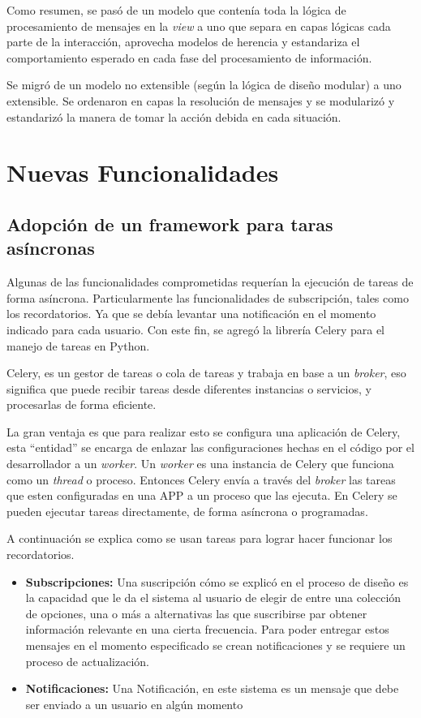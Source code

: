         \par Como resumen, se pasó de un modelo que contenía toda la lógica de procesamiento de mensajes en la \textit{view} a uno que separa en capas lógicas cada parte de la interacción, aprovecha modelos de herencia y estandariza el comportamiento esperado en cada fase del procesamiento de información.


    \par Se migró de un modelo no extensible (según la lógica de diseño modular) a uno extensible. Se ordenaron en capas la resolución de mensajes y se modularizó y estandarizó la manera de tomar la acción debida en cada situación.

\section{Nuevas Funcionalidades}
    \subsection{Adopción de un framework para taras asíncronas}
    \par Algunas de las funcionalidades comprometidas requerían la ejecución de tareas de forma asíncrona. Particularmente las funcionalidades de subscripción, tales como los recordatorios. Ya que se debía levantar una notificación en el momento indicado para cada usuario. Con este fin, se agregó la librería \gls{Celery} para el manejo de tareas en Python.
    \par \gls{Celery}, es un gestor de tareas o cola de tareas y trabaja en base a un \textit{broker}, eso significa que puede recibir tareas desde diferentes instancias o servicios, y procesarlas de forma eficiente.
    \par La gran ventaja es que para realizar esto se configura una aplicación de \gls{Celery}, esta “entidad” se encarga de enlazar las configuraciones hechas en el código por el desarrollador a un \textit{worker}. Un \textit{worker} es una instancia de \gls{Celery} que funciona como un \textit{thread} o proceso. Entonces \gls{Celery} envía a través del \textit{broker} las tareas que esten configuradas en una APP a un proceso que las ejecuta. En \gls{Celery} se pueden ejecutar tareas directamente, de forma asíncrona o programadas.
    \par A continuación se explica como se usan tareas para lograr hacer funcionar los recordatorios.

    \begin{itemize}
        \item \textbf{Subscripciones:} Una suscripción cómo se explicó en el proceso de diseño es la capacidad que le da el sistema al usuario de elegir de entre una colección de opciones, una o más a alternativas las que suscribirse par obtener información relevante en una cierta frecuencia. Para poder entregar estos mensajes en el momento especificado se crean notificaciones y se requiere un proceso de actualización.
        \item \textbf{Notificaciones:} Una Notificación, en este sistema es un mensaje que debe ser enviado a un usuario en algún momento
    \end{itemize}


